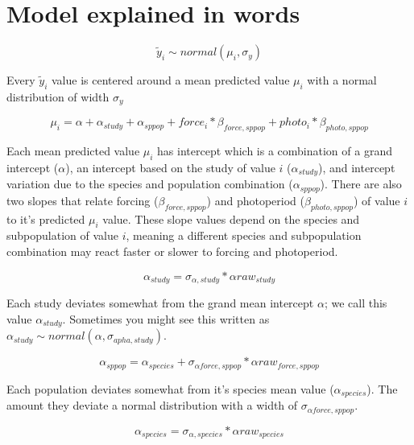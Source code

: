 \documentclass[11pt,letter]{article}
\begin{document}
\section{Model explained in words}



\begin{equation}
\tilde{y}_{i}\sim normal(\mu_{i},\sigma_{y})
\end{equation}

Every $\tilde{y}_{i}$ value is centered around a mean predicted value $\mu_{i}$ with a normal distribution of width $\sigma_{y}$

\begin{equation}
\mu_{i} = \alpha + \alpha_{study} + \alpha_{sppop} + force_{i} * \beta _{force,sppop} + photo_{i} * \beta _{photo,sppop} 
\end{equation}

Each mean predicted value $\mu_{i}$ has intercept which is a combination of a grand intercept ($\alpha$), an intercept based on the study of value $i$ ($\alpha_{study}$), and intercept variation due to the species and population combination ($\alpha_{sppop}$). There are also two slopes that relate forcing ($\beta _{force,sppop} $) and photoperiod ($\beta _{photo,sppop} $) of value $i$ to it's predicted $\mu_{i}$ value. These slope values depend on the species and subpopulation of value $i$, meaning a different species and subpopulation combination may react faster or slower to forcing and photoperiod. 

\begin{equation}
\alpha_{study} = \sigma_{\alpha, study} * \alpha raw_{study}
\end{equation}

Each study deviates somewhat from the grand mean intercept $\alpha$; we call this value $\alpha_{study}$. Sometimes you might see this written as  $\alpha_{study} \sim normal(\alpha, \sigma_{apha,study})$. 

\begin{equation}
\alpha_{sppop} = \alpha_{species}  + \sigma_{\alpha force,sppop} * \alpha raw_{force,sppop}
\end{equation}

Each population deviates somewhat from it's species mean value ($\alpha_{species}$). The amount they deviate a normal distribution with a width of $\sigma_{\alpha force,sppop}$. 

\begin{equation}
\alpha_{species} = \sigma_{\alpha, species} * \alpha raw_{species}
\end{equation}
\end{document}
